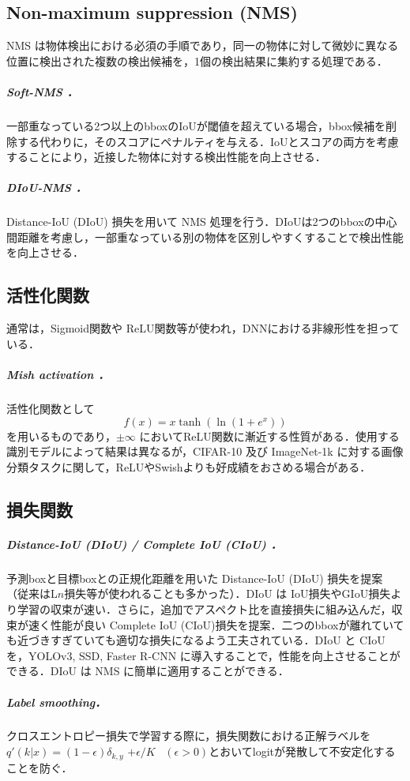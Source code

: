 \documentclass[twocolumn]{jsarticle} %
\begin{document}
\subsection{Non-maximum suppression (NMS)}
NMS は物体検出における必須の手順であり，同一の物体に対して微妙に異なる位置に検出された複数の検出候補を，1個の検出結果に集約する処理である．

\subparagraph{Soft-NMS \cite{BSCD17}．} \label{sec:soft_NMS} 一部重なっている2つ以上のbboxのIoUが閾値を超えている場合，bbox候補を削除する代わりに，そのスコアにペナルティを与える．IoUとスコアの両方を考慮することにより，近接した物体に対する検出性能を向上させる．

\subparagraph{DIoU-NMS \cite{ZWLLYR20}．} Distance-IoU (DIoU) 損失を用いて NMS 処理を行う．DIoUは2つのbboxの中心間距離を考慮し，一部重なっている別の物体を区別しやすくすることで検出性能を向上させる．

\subsection{活性化関数}
通常は，Sigmoid関数\cite{RHW86}や ReLU関数\cite{NaiHin10}等が使われ，DNNにおける非線形性を担っている．

\subparagraph{Mish activation \cite{Misra20}．}
活性化関数として $$f(x) = x \tanh(\ln(1 + e^x))$$ を用いるものであり，$\pm\infty$ においてReLU関数に漸近する性質がある．使用する識別モデルによって結果は異なるが，CIFAR-10 及び ImageNet-1k に対する画像分類タスクに関して，ReLUやSwish\cite{RZL18}よりも好成績をおさめる場合がある．

\subsection{損失関数}
\subparagraph{Distance-IoU (DIoU) / Complete IoU (CIoU) \cite{ZWLLYR20}．} \label{sec:CIoU} 予測boxと目標boxとの正規化距離を用いた Distance-IoU (DIoU) 損失を提案（従来はL$n$損失等が使われることも多かった）．DIoU は IoU損失やGIoU損失より学習の収束が速い．さらに，追加でアスペクト比を直接損失に組み込んだ，収束が速く性能が良い Complete IoU (CIoU)損失を提案．二つのbboxが離れていても近づきすぎていても適切な損失になるよう工夫されている．DIoU と CIoU を，YOLOv3, SSD\cite{LAESRFB16}, Faster R-CNN に導入することで，性能を向上させることができる．DIoU は NMS に簡単に適用することができる．

\subparagraph{Label smoothing\cite{SVISW16}．} \label{sec:label_smooth}
クロスエントロピー損失で学習する際に，損失関数における正解ラベルを $q'(k|x){=}(1{-}\epsilon)\delta_{k,y}$ 
${+}\epsilon/K$ \ $(\epsilon{>}0)$とおいてlogitが発散して不安定化することを防ぐ．
\end{document}
